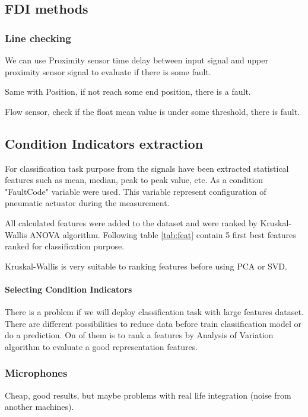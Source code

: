 \documentclass[class=article, crop=false]{standalone}
\begin{document}
\subsection{FDI methods}

\subsubsection{Line checking}

We can use Proximity sensor time delay between input signal and upper
proximity sensor signal to evaluate if there is some fault.

Same with Position, if not reach some end position, there is a fault.

Flow sensor, check if the float mean value is under some threshold, there
is fault.


\subsection{Condition Indicators extraction}

For classification task purpose from the signals have been extracted
statistical features such as mean, median, peak to peak value, etc.
As a condition "FaultCode" variable
were used. This variable represent configuration of pneumatic actuator
during the measurement.

All calculated features were added to the dataset and were ranked by
Kruskal-Wallis ANOVA algorithm. Following table \ref{tab:feat} contain
5 first best features ranked for classification purpose.

Kruskal-Wallis is very suitable to ranking features before using PCA or
SVD.

\paragraph{Selecting Condition Indicators} There is a problem if we will
deploy classification task with large features dataset.
There are different possibilities to reduce data before train
classification model or do a prediction. On of them is to rank a features
by Analysis of Variation algorithm to evaluate a good representation
features.




\subsubsection{Microphones}
Cheap, good results, but maybe problems with real life integration (noise
from another machines).
\end{document}
